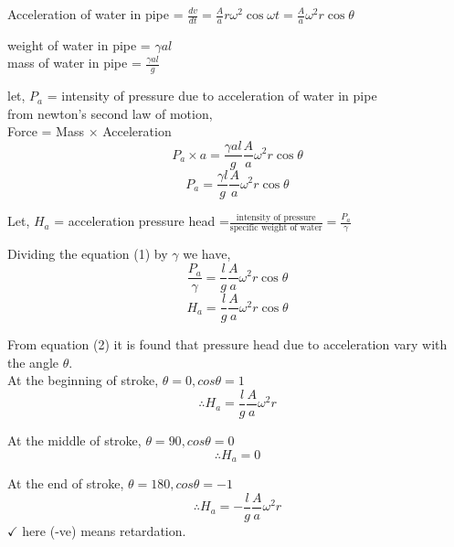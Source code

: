 \documentclass{article}
\begin{document}
  Acceleration of water in pipe = $\frac{dv}{dt} = \frac{A}{a} r \omega^2 \cos \omega t = \frac{A}{a} \omega^2 r \cos \theta$ 

  weight of water in pipe = $\gamma a l$ \\ 
  mass of water in pipe = $\frac{\gamma a l}{g}$

  let, $P_a$ = intensity of pressure due to acceleration of water in pipe \\
  from newton's second law of motion,\\
  Force = Mass $\times$ Acceleration \\
  $$P_a \times a = \frac{\gamma a l}{g} \frac{A}{a} \omega^2 r \cos \theta$$
  \begin{equation}
    P_a = \frac{\gamma l}{g} \frac{A}{a} \omega^2 r \cos \theta \label{eq:eq1}
  \end{equation}

  Let, $H_a$ = acceleration pressure head 
  =$\frac{\text{intensity of pressure}}{\text{specific weight of water}} = \frac{P_a}{\gamma}$

  Dividing the equation (1) by $\gamma$ we have,
  $$\frac{P_a}{\gamma} = \frac{l}{g} \frac{A}{a} \omega^2 r \cos \theta$$
  \begin{equation}
    H_a = \frac{l}{g} \frac{A}{a} \omega^2 r \cos \theta \label{eq:eq2}
  \end{equation}

  From equation (2) it is found that pressure head due to acceleration vary with the angle $\theta$. \\
  At the beginning of stroke, $\theta = 0, cos\theta = 1$ \\
  $$\therefore H_a = \frac{l}{g} \frac{A}{a} \omega^2 r$$ 

  At the middle of stroke, $\theta = 90, cos\theta = 0$ \\
  $$\therefore H_a = 0$$ 

  At the end of stroke, $\theta = 180, cos\theta = -1$ \\
  $$\therefore H_a = - \frac{l}{g} \frac{A}{a} \omega^2 r$$ 
  $\checkmark$ here (-ve) means retardation.

  \hrulefill 
\end{document}
